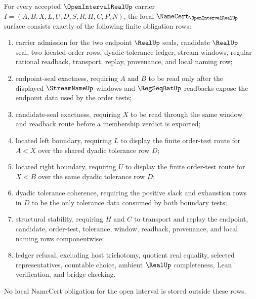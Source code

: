 \begin{theorem}
\label{thm:open-interval-real-namecert-obligations}
For every accepted $\OpenIntervalRealUp$ carrier $I=(A,B,X,L,U,D,S,R,H,C,P,N)$, the local $\NameCert_{\OpenIntervalRealUp}$ surface consists exactly of the following finite obligation rows:
\begin{enumerate}
\item carrier admission for the two endpoint $\RealUp$ seals, candidate $\RealUp$ seal, two located-order rows, dyadic tolerance ledger, stream windows, regular rational readback, transport, replay, provenance, and local naming row;
\item endpoint-seal exactness, requiring $A$ and $B$ to be read only after the displayed $\StreamNameUp$ windows and $\RegSeqRatUp$ readbacks expose the endpoint data used by the order tests;
\item candidate-seal exactness, requiring $X$ to be read through the same window and readback route before a membership verdict is exported;
\item located left boundary, requiring $L$ to display the finite order-test route for $A<X$ over the shared dyadic tolerance row $D$;
\item located right boundary, requiring $U$ to display the finite order-test route for $X<B$ over the same dyadic tolerance row $D$;
\item dyadic tolerance coherence, requiring the positive slack and exhaustion rows in $D$ to be the only tolerance data consumed by both boundary tests;
\item structural stability, requiring $H$ and $C$ to transport and replay the endpoint, candidate, order-test, tolerance, window, readback, provenance, and local naming rows componentwise;
\item ledger refusal, excluding host trichotomy, quotient real equality, selected representatives, countable choice, ambient $\RealUp$ completeness, Lean verification, and bridge checking.
\end{enumerate}
No local NameCert obligation for the open interval is stored outside these rows.
\end{theorem}
